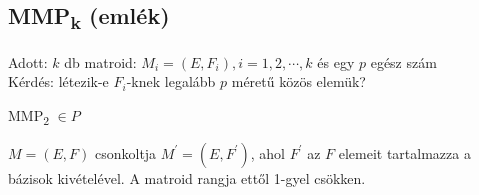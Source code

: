 \subsection*{{MMP\textsubscript{k}} (emlék)}
Adott: $k$ db matroid: $M_{i}=(E,F_{i}), i=1,2,\cdots ,k$ és egy $p$ egész szám\\
Kérdés: létezik-e $F_{i}$-knek legalább $p$ méretű közös elemük?
\begin{theo} {MMP\textsubscript{2}} $\in P$ \end{theo}
\begin{defn} [Csonkolt]
$M=(E,F)$ csonkoltja $M^{'}=(E,F^{'})$, ahol $F^{'}$ az $F$ elemeit tartalmazza a bázisok kivételével. A matroid rangja ettől 1-gyel csökken.
\end{defn}